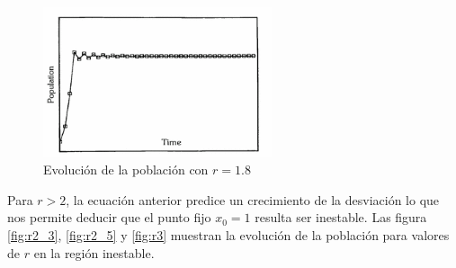 \begin{figure}[hbtp]
\centering
\includegraphics[width = 0.6\textwidth]{img/r1_8.png}
\caption{Evolución de la población con $r=1.8$}
\label{fig:r1_8}
\end{figure}

Para $r>2$, la ecuación anterior predice un crecimiento de la desviación lo que nos permite deducir que el punto fijo $x_0=1$ resulta ser inestable. Las figura \ref{fig:r2_3}, \ref{fig:r2_5} y \ref{fig:r3} muestran la evolución de la población para valores de $r$ en la región inestable.

